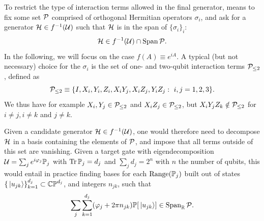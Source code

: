 To restrict the type of interaction terms allowed in the final generator, means to fix some set $\mathcal{P}$ comprised of orthogonal Hermitian operators $\sigma_i$, and ask for a generator $\mathcal{H}\in f^{-1}(\mathcal{U})$ such that $\mathcal{H}$ is in the span of $\{\sigma_i\}_i$:
\begin{equation}
    \mathcal{H} \in f^{-1}(\mathcal{U}) \cap \operatorname{Span}\mathcal{P}.
\end{equation}
In the following, we will focus on the case  $f(A)\equiv e^{iA}$. 
A typical (but not necessary) choice for the $\sigma_i$ is the set of one- and two-qubit interaction terms $\mathcal{P}_{\le2}$, defined as
\begin{equation}
    \mathcal{P}_{\le2} \equiv \{ I, X_i,Y_i,Z_i, X_i Y_j, X_i Z_j, Y_i Z_j : \,\,i,j=1,2,3 \}.
\end{equation}
We thus have for example $X_i,Y_j\in\mathcal{P}_{\le2}$ and $X_i Z_j\in\mathcal{P}_{\le2}$, but $X_i Y_j Z_k\notin\mathcal{P}_{\le2}$ for $i\neq j,i\neq k$ and $j\neq k$.

Given a candidate generator $\mathcal{H}\in f^{-1}(\mathcal{U})$, one would therefore need to decompose $\mathcal{H}$ in a basis containing the elements of $\mathcal{P}$, and impose that all terms outside of this set are vanishing.
Given a target gate with eigendecomposition
$\mathcal{U}=\sum_j e^{i\varphi_j}\mathbb{P}_j$ with $\Tr\mathbb{P}_j=d_j$ and $\sum_j d_j=2^n$ with $n$ the number of qubits, this would entail in practice finding bases for each $\operatorname{Range}(\mathbb{P}_j)$ built out of states $\{\ket*{u_{jk}}\}_{k=1}^{d_j}\subset \mathbb{CP}^{d_j}$, and integers $n_{jk}$, such that
\begin{equation}
    \sum_j\sum_{k=1}^{d_j} (\varphi_j + 2\pi n_{jk}) \mathbb{P}[\ket*{u_{jk}}]
    \in \operatorname{Span}_{\mathbb{R}}\mathcal{P}.
\end{equation}

